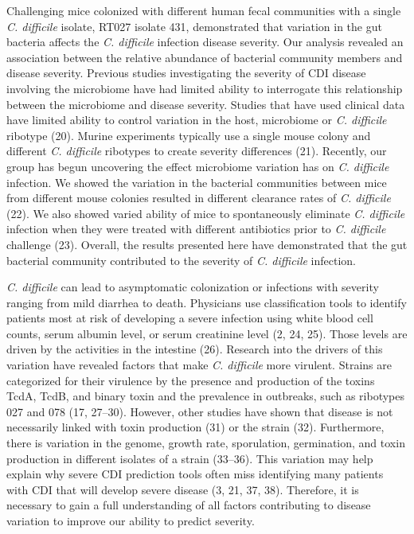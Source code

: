\documentclass[
  12pt,
]{article}
\begin{document}
Challenging mice colonized with different human fecal communities with a
single \emph{C. difficile} isolate, RT027 isolate 431, demonstrated that
variation in the gut bacteria affects the \emph{C. difficile} infection
disease severity. Our analysis revealed an association between the
relative abundance of bacterial community members and disease severity.
Previous studies investigating the severity of CDI disease involving the
microbiome have had limited ability to interrogate this relationship
between the microbiome and disease severity. Studies that have used
clinical data have limited ability to control variation in the host,
microbiome or \emph{C. difficile} ribotype (20). Murine experiments
typically use a single mouse colony and different \emph{C. difficile}
ribotypes to create severity differences (21). Recently, our group has
begun uncovering the effect microbiome variation has on \emph{C.
difficile} infection. We showed the variation in the bacterial
communities between mice from different mouse colonies resulted in
different clearance rates of \emph{C. difficile} (22). We also showed
varied ability of mice to spontaneously eliminate \emph{C. difficile}
infection when they were treated with different antibiotics prior to
\emph{C. difficile} challenge (23). Overall, the results presented here
have demonstrated that the gut bacterial community contributed to the
severity of \emph{C. difficile} infection.

\emph{C. difficile} can lead to asymptomatic colonization or infections
with severity ranging from mild diarrhea to death. Physicians use
classification tools to identify patients most at risk of developing a
severe infection using white blood cell counts, serum albumin level, or
serum creatinine level (2, 24, 25). Those levels are driven by the
activities in the intestine (26). Research into the drivers of this
variation have revealed factors that make \emph{C. difficile} more
virulent. Strains are categorized for their virulence by the presence
and production of the toxins TcdA, TcdB, and binary toxin and the
prevalence in outbreaks, such as ribotypes 027 and 078 (17, 27--30).
However, other studies have shown that disease is not necessarily linked
with toxin production (31) or the strain (32). Furthermore, there is
variation in the genome, growth rate, sporulation, germination, and
toxin production in different isolates of a strain (33--36). This
variation may help explain why severe CDI prediction tools often miss
identifying many patients with CDI that will develop severe disease (3,
21, 37, 38). Therefore, it is necessary to gain a full understanding of
all factors contributing to disease variation to improve our ability to
predict severity.
\end{document}
